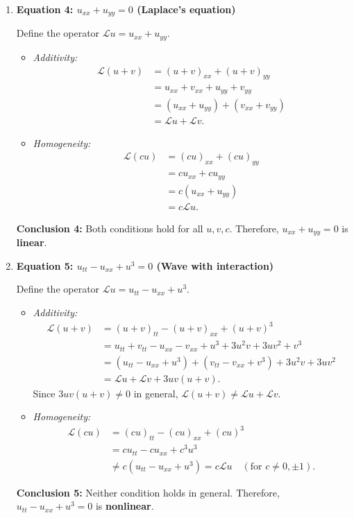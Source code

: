 \documentclass[11pt,a4paper]{article}
\begin{document}
\begin{enumerate}[label=\textbf{\arabic*.}]
    \item \textbf{Equation 4: $u_{xx} + u_{yy} = 0$ (Laplace's equation)}
    
    Define the operator $\mathcal{L}u = u_{xx} + u_{yy}$.
    \begin{itemize}
        \item \emph{Additivity:}
        \begin{align*}
            \mathcal{L}(u + v) &= (u + v)_{xx} + (u + v)_{yy} \\
            &= u_{xx} + v_{xx} + u_{yy} + v_{yy} \\
            &= (u_{xx} + u_{yy}) + (v_{xx} + v_{yy}) \\
            &= \mathcal{L}u + \mathcal{L}v.
        \end{align*}
        \item \emph{Homogeneity:}
        \begin{align*}
            \mathcal{L}(cu) &= (cu)_{xx} + (cu)_{yy} \\
            &= c u_{xx} + c u_{yy} \\
            &= c(u_{xx} + u_{yy}) \\
            &= c\mathcal{L}u.
        \end{align*}
    \end{itemize}
    \textbf{Conclusion 4:} Both conditions hold for all $u, v, c$. Therefore, $u_{xx} + u_{yy} = 0$ is \textbf{linear}.

    \item \textbf{Equation 5: $u_{tt} - u_{xx} + u^3 = 0$ (Wave with interaction)}
    
    Define the operator $\mathcal{L}u = u_{tt} - u_{xx} + u^3$.
    \begin{itemize}
        \item \emph{Additivity:}
        \begin{align*}
            \mathcal{L}(u + v) &= (u + v)_{tt} - (u + v)_{xx} + (u + v)^3 \\
            &= u_{tt} + v_{tt} - u_{xx} - v_{xx} + u^3 + 3u^2 v + 3u v^2 + v^3 \\
            &= (u_{tt} - u_{xx} + u^3) + (v_{tt} - v_{xx} + v^3) + 3u^2 v + 3u v^2 \\
            &= \mathcal{L}u + \mathcal{L}v + 3u v(u + v).
        \end{align*}
        Since $3u v(u + v) \neq 0$ in general, $\mathcal{L}(u + v) \neq \mathcal{L}u + \mathcal{L}v$.
        \item \emph{Homogeneity:}
        \begin{align*}
            \mathcal{L}(cu) &= (cu)_{tt} - (cu)_{xx} + (cu)^3 \\
            &= c u_{tt} - c u_{xx} + c^3 u^3 \\
            &\neq c(u_{tt} - u_{xx} + u^3) = c\mathcal{L}u \quad (\text{for } c \neq 0, \pm 1).
        \end{align*}
    \end{itemize}
    \textbf{Conclusion 5:} Neither condition holds in general. Therefore, $u_{tt} - u_{xx} + u^3 = 0$ is \textbf{nonlinear}.


\end{enumerate}
\end{document}
